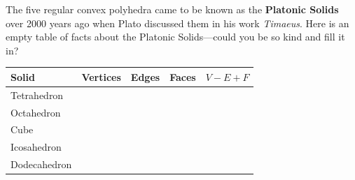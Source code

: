 \documentclass[noauthor,nooutcomes,hints,handout]{ximera}
\begin{document}
\mynewpage

\begin{question}
  The five regular convex polyhedra came to be known as the
  \textbf{Platonic Solids} over 2000 years ago
  when Plato discussed them in his work \textit{Timaeus}. Here is an
  empty table of facts about the Platonic Solids---could you be so kind
  and fill it in?
  \begin{center}
    {
      \renewcommand{\arraystretch}{3}
      \begin{tabular}{|l||c|c|c|c|}\hline
        Solid & Vertices & Edges & Faces & $V - E + F$\\
        \hline\hline
        Tetrahedron &  &   &  &   \\ \hline
        Octahedron &   &  &  &  \\ \hline
        Cube &  &   &  & \\ \hline
        Icosahedron &  &  &  & \\ \hline
        Dodecahedron &  &  &  & \\ \hline
\end{tabular}}
\end{center}
\end{question}
\end{document}
